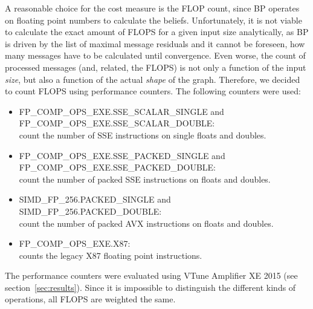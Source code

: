 A reasonable choice for the cost measure is the FLOP count, since BP operates on floating point numbers to calculate the beliefs. Unfortunately, it is not viable to calculate the exact amount of FLOPS for a given input size analytically, as BP is driven by the list of maximal message residuals and it cannot be foreseen, how many messages have to be calculated until convergence. Even worse, the count of processed messages (and, related, the FLOPS) is not only a function of the input \textit{size}, but also a function of the actual \textit{shape} of the graph. Therefore, we decided to count FLOPS using performance counters. The following counters were used:

\begin{itemize}
	\item FP\_COMP\_OPS\_EXE.SSE\_SCALAR\_SINGLE and \\FP\_COMP\_OPS\_EXE.SSE\_SCALAR\_DOUBLE:\\count the number of SSE instructions on single floats and doubles.
	\item FP\_COMP\_OPS\_EXE.SSE\_PACKED\_SINGLE and \\FP\_COMP\_OPS\_EXE.SSE\_PACKED\_DOUBLE:\\count the number of packed SSE instructions on floats and doubles.
	\item SIMD\_FP\_256.PACKED\_SINGLE and \\SIMD\_FP\_256.PACKED\_DOUBLE:\\count the number of packed AVX instructions on floats and doubles.
	\item FP\_COMP\_OPS\_EXE.X87:\\counts the legacy X87 floating point instructions.
\end{itemize}

The performance counters were evaluated using VTune Amplifier XE 2015 (see section~\ref{sec:results}).
Since it is impossible to distinguish the different kinds of operations, all FLOPS are weighted the same.


%
%
%
